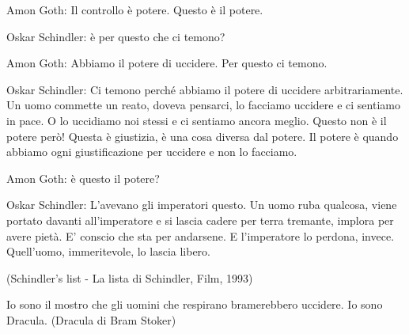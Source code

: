 \bigskip

\begin{changemargin}{0cm}{0.5cm}\begin{enfasi}{

Amon Goth: Il controllo è potere. Questo è il potere.

Oskar Schindler: è per questo che ci temono?

Amon Goth: Abbiamo il potere di uccidere. Per questo ci temono.

Oskar Schindler: Ci temono perché abbiamo il potere di uccidere arbitrariamente. Un uomo commette un reato, doveva pensarci, lo facciamo uccidere e ci sentiamo in pace. O lo uccidiamo noi stessi e ci sentiamo ancora meglio. Questo non è il potere però! Questa è giustizia, è una cosa diversa dal potere. Il potere è quando abbiamo ogni giustificazione per uccidere e non lo facciamo.

Amon Goth: è questo il potere?

Oskar Schindler: L'avevano gli imperatori questo. Un uomo ruba qualcosa, viene portato davanti all'imperatore e si lascia cadere per terra tremante, implora per avere pietà. E' conscio che sta per andarsene. E l'imperatore lo perdona, invece. Quell'uomo, immeritevole, lo lascia libero.

(Schindler's list - La lista di Schindler, Film, 1993)
}\end{enfasi}\end{changemargin}\medskip


\begin{changemargin}{0cm}{0.5cm}\begin{enfasi}{
Io sono il mostro che gli uomini che respirano bramerebbero uccidere. Io sono Dracula. (Dracula di Bram Stoker)}\end{enfasi}\end{changemargin}\medskip


\bigskip

